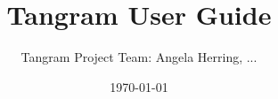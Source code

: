 \iffalse
This file is part of the Ristra tangram project.
Please see the license file at the root of this repository, or at:
https://github.com/laristra/tangram/blob/master/LICENSE
\fi


\title{Tangram User Guide}
\date{\today}
\author{Tangram Project Team: Angela Herring, ...}

